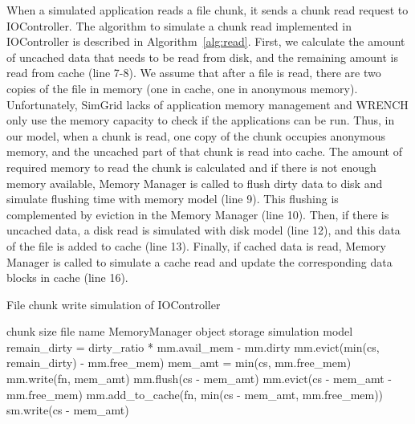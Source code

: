 \documentclass[conference]{IEEEtran}
\newcommand{\Desc}[2]{\State \makebox[2em][l]{#1}#2}
\begin{document}
            When a simulated application reads a file chunk, it sends a chunk read request 
            to IOController.             
            The algorithm to simulate a chunk read implemented in IOController 
            is described in Algorithm~\ref{alg:read}.   
            First, we calculate the amount of uncached data that needs to be read 
            from disk, and the remaining amount is read from cache (line 7-8).
            We assume that after a file is read, there are two copies of the file in memory 
            (one in cache, one in anonymous memory). 
            Unfortunately, SimGrid lacks of application memory management and WRENCH 
            only use the memory capacity to check if the applications can be run. 
            Thus, in our model, when a chunk is read, one copy of the chunk 
            occupies anonymous memory, and the uncached part of that chunk is 
            read into cache.    
            The amount of required memory to read the chunk is calculated and 
            if there is not enough memory available, Memory Manager is called to 
            flush dirty data to disk and simulate flushing time with memory model (line 9). 
            This flushing is complemented by eviction in the Memory Manager (line 10). 
            Then, if there is uncached data, a disk read is simulated with disk model (line 12), 
            and this data of the file is added to cache (line 13).
            Finally, if cached data is read, Memory Manager is called to simulate a cache read  
            and update the corresponding data blocks in cache (line 16).

            \begin{algorithm}\caption{File chunk write simulation of IOController}
            \label{alg:write}
                \small
                \begin{algorithmic}[1]
                    \Input
                        \Desc{cs}{chunk size}
                        \Desc{fn}{file name}
                        \Desc{mm}{MemoryManager object}
                        \Desc{sm}{storage simulation model}
                       \EndInput
                    \State remain\_dirty = dirty\_ratio * mm.avail\_mem - mm.dirty
                     
                        \State mm.evict(min(cs, remain\_dirty) - mm.free\_mem)
                        \State mem\_amt = min(cs, mm.free\_mem)
                        \State mm.write(fn, mem\_amt) 
                    \EndIf
                      
                        \State mm.flush(cs - mem\_amt)  
                        \State mm.evict(cs - mem\_amt  - mm.free\_mem) 
                        \State mm.add\_to\_cache(fn, min(cs - mem\_amt, mm.free\_mem))
                        \State sm.write(cs - mem\_amt)
                    \EndIf
                    
                \end{algorithmic}
            \end{algorithm}
\end{document}
